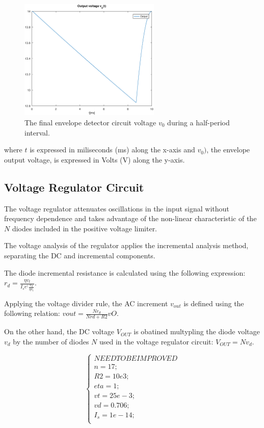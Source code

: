 \begin{figure}[H] \centering
\includegraphics[width=0.6\textwidth]{envelope.eps}
\caption{The final envelope detector circuit voltage $v_0$ during a half-period interval.}
\label{fig:envelope}
\end{figure}

where $t$ is expressed in miliseconds (ms) along the x-axis and 
$v_0)$, the envelope output voltage, is expressed in Volts (V) along the y-axis.

\subsection{Voltage Regulator Circuit}
\label{subsec:regulator}

The voltage regulator attenuates oscillations in the input signal without frequency dependence and takes advantage of the non-linear characteristic of the $N$ diodes included in the positive voltage limiter. 

The voltage analysis of the regulator applies the incremental analysis method, separating the DC and incremental components.

The diode incremental resistance is calculated using the following expression: $r_d=\frac{\eta v_t}{I_s e^(\frac{v_d}{\eta v_t}}$.

Applying the voltage divider rule, the AC increment $v_{out}$ is defined using the following relation: $vout=\frac{N r_d}{N rd+R2}vO$.

On the other hand, the DC voltage $V_{OUT}$ is obatined multypling the diode voltage $v_d$ by the number of diodes $N$ used in the voltage regulator circuit: $V_{OUT}=N v_d$.

\[
\left\{\begin{matrix}
NEED TO BE IMPROVED\\
n=17;\\
R2=10e3;\\
eta=1;\\
vt=25e-3;\\
vd=0.706;\\
I_s=1e-14;\\
\end{matrix}\right.
\]

